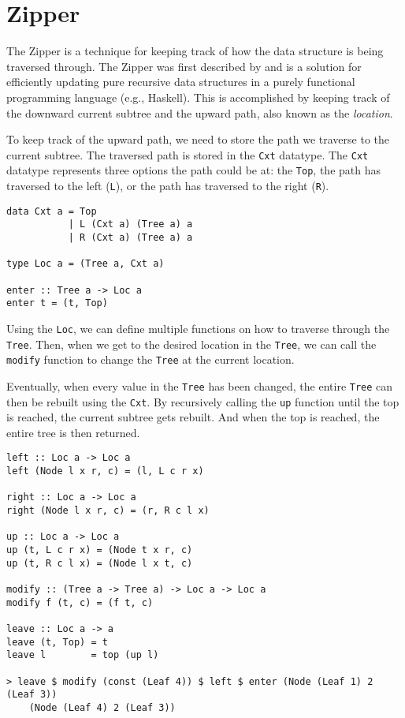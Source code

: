 \section{Zipper}
\label{sec-spec-zipper}


The Zipper is a technique for keeping track of how the data structure is being traversed through. The Zipper was first described by \citeauthor{huet1997zipper}\cite{huet1997zipper} and is a solution for efficiently updating pure recursive data structures in a purely functional programming language (e.g., Haskell). This is accomplished by keeping track of the downward current subtree and the upward path, also known as the \textit{location}. 

To keep track of the upward path, we need to store the path we traverse to the current subtree. The traversed path is stored in the \texttt{Cxt} datatype. The \texttt{Cxt} datatype represents three options the path could be at: the \texttt{Top}, the path has traversed to the left (\texttt{L}), or the path has traversed to the right (\texttt{R}).

\begin{verbatim}
data Cxt a = Top
           | L (Cxt a) (Tree a) a
           | R (Cxt a) (Tree a) a

type Loc a = (Tree a, Cxt a)

enter :: Tree a -> Loc a
enter t = (t, Top)           
\end{verbatim}

Using the \texttt{Loc}, we can define multiple functions on how to traverse through the \texttt{Tree}. Then, when we get to the desired location in the \texttt{Tree}, we can call the \texttt{modify} function to change the \texttt{Tree} at the current location.

Eventually, when every value in the \texttt{Tree} has been changed, the entire \texttt{Tree} can then be rebuilt using the \texttt{Cxt}. By recursively calling the \texttt{up} function until the top is reached, the current subtree gets rebuilt. And when the top is reached, the entire tree is then returned.

\begin{verbatim}
left :: Loc a -> Loc a
left (Node l x r, c) = (l, L c r x)

right :: Loc a -> Loc a
right (Node l x r, c) = (r, R c l x)

up :: Loc a -> Loc a
up (t, L c r x) = (Node t x r, c)
up (t, R c l x) = (Node l x t, c)

modify :: (Tree a -> Tree a) -> Loc a -> Loc a
modify f (t, c) = (f t, c)

leave :: Loc a -> a
leave (t, Top) = t
leave l        = top (up l)

> leave $ modify (const (Leaf 4)) $ left $ enter (Node (Leaf 1) 2 (Leaf 3))
    (Node (Leaf 4) 2 (Leaf 3))
\end{verbatim}


